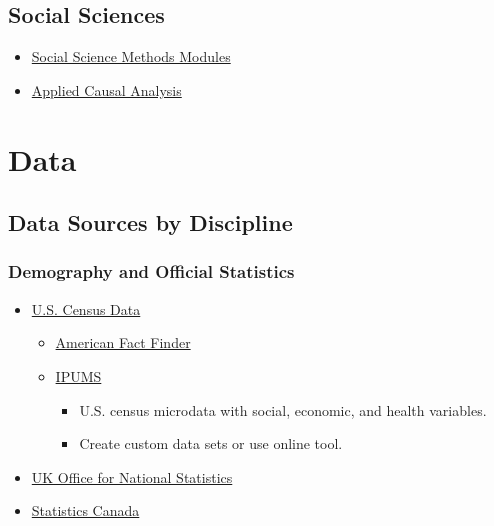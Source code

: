 \documentclass[]{book}
\providecommand{\tightlist}{%
  \setlength{\itemsep}{0pt}\setlength{\parskip}{0pt}}
\begin{document}
\hypertarget{social-sciences}{%
\section*{Social Sciences}\label{social-sciences}}

\begin{itemize}
\tightlist
\item
  \href{https://modu.ssri.duke.edu/}{Social Science Methods Modules}
\item
  \href{https://bookdown.org/paulcbauer/causal_analysis/}{Applied Causal Analysis}
\end{itemize}

\hypertarget{data}{%
\chapter{Data}\label{data}}

\hypertarget{data-sources-by-discipline}{%
\section{Data Sources by Discipline}\label{data-sources-by-discipline}}

\hypertarget{demography-and-official-statistics}{%
\subsection{Demography and Official Statistics}\label{demography-and-official-statistics}}

\begin{itemize}
\item
  \href{https://www.census.gov/data.html}{U.S. Census Data}

  \begin{itemize}
  \tightlist
  \item
    \href{https://factfinder.census.gov/faces/nav/jsf/pages/index.xhtml}{American Fact Finder}
  \item
    \href{https://usa.ipums.org/usa/}{IPUMS}

    \begin{itemize}
    \tightlist
    \item
      U.S. census microdata with social, economic, and health variables.
    \item
      Create custom data sets or use online tool.
    \end{itemize}
  \end{itemize}
\item
  \href{https://www.ons.gov.uk/peoplepopulationandcommunity}{UK Office for National Statistics}
\item
  \href{https://www.statcan.gc.ca/eng/start}{Statistics Canada}
\end{itemize}
\end{document}
